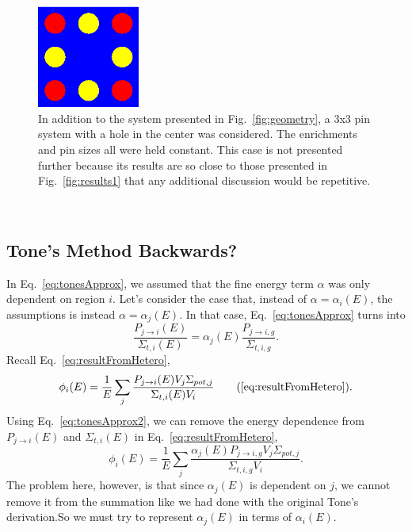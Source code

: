 \documentclass[10pt]{article}
\begin{document}
 \begin{figure}
    \begin{center}
      \includegraphics[width=0.3\textwidth]{hole_3x3}
      \caption{In addition to the system presented in Fig.~\ref{fig:geometry}, a 3x3 pin system with a hole in the center was considered. The enrichments and pin sizes all were held constant. This case is not presented further because its results are so close to those presented in Fig.~\ref{fig:results1} that any additional discussion would be repetitive.}
      \label{fig:hole}
    \end{center}
\end{figure}



\newpage





~\newpage


\subsection{Tone's Method Backwards?}
In Eq.~\ref{eq:tonesApprox}, we assumed that the fine energy term $\alpha$ was only dependent on region $i$. Let's consider the case that, instead of $\alpha=\alpha_i(E)$, the assumptions is instead $\alpha=\alpha_j(E)$. In that case, Eq.~\ref{eq:tonesApprox} turns into
\begin{equation}\frac{P_{j\rightarrow i}(E)}{\Sigma_{t,i}(E)}=\alpha_{j}(E)\frac{P_{j\rightarrow i,g}}{\Sigma_{t,i,g}}\label{eq:tonesApprox2}.\end{equation}
Recall Eq.~\ref{eq:resultFromHetero},
\begin{equation*}\phi_{i}(E)=\frac{1}{E}\sum\limits_j\frac{P_{j\rightarrow i}(E)V_{j}\Sigma_{pot,j}}{\Sigma_{t,i}(E)V_{i}}\tag{\ref{eq:resultFromHetero}}.\end{equation*}
  Using Eq.~\ref{eq:tonesApprox2}, we can remove the energy dependence from $P_{j\rightarrow i}(E)$ and $\Sigma_{t,i}(E)$ in Eq.~\ref{eq:resultFromHetero},
\begin{equation}\phi_{i}(E)=\frac{1}{E}\sum\limits_j\frac{\alpha_j(E)P_{j\rightarrow i,g}V_{j}\Sigma_{pot,j}}{\Sigma_{t,i,g}V_{i}}.\label{eq:phiWithalphaj}\end{equation}
The problem here, however, is that since $\alpha_j(E)$ is dependent on $j$, we cannot remove it from the summation like we had done with the original Tone's derivation.So we must try to represent $\alpha_j(E)$ in terms of $\alpha_i(E)$.
\end{document}
